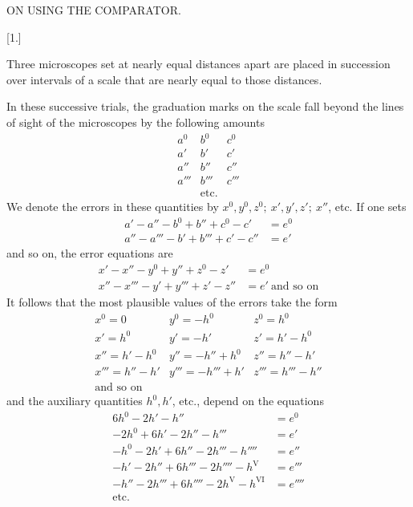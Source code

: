 \begin{center}ON USING THE COMPARATOR.\end{center}
\begin{center}[1.]\end{center}
Three microscopes set at nearly equal distances apart are placed in succession over intervals of a scale that are nearly equal to those distances.

In these successive trials, the graduation marks on the scale fall beyond the lines of sight of the microscopes by the following amounts
\[
\begin{array}{ccc}
a^0&b^0&c^0\\
a'&b'&c'\\
a''&b''&c''\\
a'''&b'''&c'''\\
&\text{etc.}&
\end{array}
\]
We denote the errors in these quantities by $x^0,y^0,z^0;\ x',y',z';\ x''$, etc. If one sets
\[
\begin{aligned}
a'-a''-b^0+b''+c^0-c'&=e^0\\
a''-a'''-b'+b'''+c'-c''&=e'
\end{aligned}
\]
and so on, the error equations are
\[
\begin{aligned}
x'-x''-y^0+y''+z^0-z'&=e^0\\
x''-x'''-y'+y'''+z'-z''&=e'\ \text{and so on}
\end{aligned}
\]
It follows that the most plausible values of the errors take the form
\[
\begin{array}{lll}
x^0=0&y^0=-h^0&z^0=h^0\\
x'=h^0&y'=-h'&z'=h'-h^0\\
x''=h'-h^0&y''=-h''+h^0&z''=h''-h'\\
x'''=h''-h'&y'''=-h'''+h'&z'''=h'''-h''\\
\text{and so on}&&
\end{array}
\]
and the auxiliary quantities $h^0,h'$, etc., depend on the equations
\[
\begin{aligned}
6h^0-2h'-h''&=e^0\\
-2h^0+6h'-2h''-h'''&=e'\\
-h^0-2h'+6h''-2h'''-h''''&=e''\\
-h'-2h''+6h'''-2h''''-h^{\mathrm V}&=e'''\\
-h''-2h'''+6h''''-2h^{\mathrm V}-h^{\mathrm {VI}}&=e''''\\
\text{etc.}&
\end{aligned}
\]

